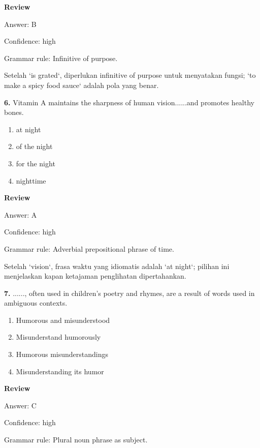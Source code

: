 \documentclass[12pt]{article}
\begin{document}
\textbf{Review}\par
Answer: B\par
Confidence: high\par
Grammar rule: Infinitive of purpose.\par
Setelah `is grated`, diperlukan infinitive of purpose untuk menyatakan fungsi; `to make a spicy food sauce` adalah pola yang benar.\par
\endgroup
\par
\vspace{0.25\baselineskip}
\noindent\textbf{6.} Vitamin A maintains the sharpness of human vision......and promotes healthy bones.
\begin{enumerate}[label=(\Alph*),leftmargin=*,itemsep=0.2em]
\item at night
\item of the night
\item for the night
\item nighttime
\end{enumerate}
\par
\begingroup
\setlength{\parskip}{0pt}
\setlength{\parindent}{0pt}
\textbf{Review}\par
Answer: A\par
Confidence: high\par
Grammar rule: Adverbial prepositional phrase of time.\par
Setelah `vision`, frasa waktu yang idiomatis adalah `at night`; pilihan ini menjelaskan kapan ketajaman penglihatan dipertahankan.\par
\endgroup
\par
\vspace{0.25\baselineskip}
\noindent\textbf{7.} ......, often used in children's poetry and rhymes, are a result of words used in ambiguous contexts.
\begin{enumerate}[label=(\Alph*),leftmargin=*,itemsep=0.2em]
\item Humorous and misunderstood
\item Misunderstand humorously
\item Humorous misunderstandings
\item Misunderstanding its humor
\end{enumerate}
\par
\begingroup
\setlength{\parskip}{0pt}
\setlength{\parindent}{0pt}
\textbf{Review}\par
Answer: C\par
Confidence: high\par
Grammar rule: Plural noun phrase as subject.\par
\end{document}
